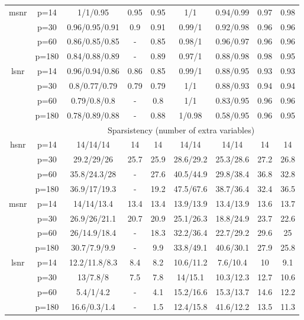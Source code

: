 \begin{table}[ht]
{\begin{tabular}{|c|c|ccccccc|}
  \midrule\multirow{4}[2]{*}{msnr} & p=14 & 1/1/0.95 & 0.95 & 0.95 & 1/1 & 0.94/0.99 & 0.97 & 0.98 \\ 
   & p=30 & 0.96/0.95/0.91 & 0.9 & 0.91 & 0.99/1 & 0.92/0.98 & 0.96 & 0.96 \\ 
   & p=60 & 0.86/0.85/0.85 & - & 0.85 & 0.98/1 & 0.96/0.97 & 0.96 & 0.96 \\ 
   & p=180 & 0.84/0.88/0.89 & - & 0.89 & 0.97/1 & 0.88/0.98 & 0.98 & 0.95 \\ 
  \midrule\multirow{4}[2]{*}{lsnr} & p=14 & 0.96/0.94/0.86 & 0.86 & 0.85 & 0.99/1 & 0.88/0.95 & 0.93 & 0.93 \\ 
   & p=30 & 0.8/0.77/0.79 & 0.79 & 0.79 & 1/1 & 0.88/0.93 & 0.94 & 0.94 \\ 
   & p=60 & 0.79/0.8/0.8 & - & 0.8 & 1/1 & 0.83/0.95 & 0.96 & 0.96 \\ 
   & p=180 & 0.78/0.89/0.88 & - & 0.88 & 1/0.98 & 0.58/0.95 & 0.96 & 0.95 \\ 
   \midrule 
 \multicolumn{1}{|c}{} &       & \multicolumn{7}{c|}{Sparsistency (number of extra variables)} \\
\midrule\multirow{4}[2]{*}{hsnr} & p=14 & 14/14/14 & 14 & 14 & 14/14 & 14/14 & 14 & 14 \\ 
   & p=30 & 29.2/29/26 & 25.7 & 25.9 & 28.6/29.2 & 25.3/28.6 & 27.2 & 26.8 \\ 
   & p=60 & 35.8/24.3/28 & - & 27.6 & 40.5/44.9 & 29.8/38.4 & 36.8 & 32.8 \\ 
   & p=180 & 36.9/17/19.3 & - & 19.2 & 47.5/67.6 & 38.7/36.4 & 32.4 & 36.5 \\ 
  \midrule\multirow{4}[2]{*}{msnr} & p=14 & 14/14/13.4 & 13.4 & 13.4 & 13.9/13.9 & 13.4/13.9 & 13.6 & 13.7 \\ 
   & p=30 & 26.9/26/21.1 & 20.7 & 20.9 & 25.1/26.3 & 18.8/24.9 & 23.7 & 22.6 \\ 
   & p=60 & 26/14.9/18.4 & - & 18.3 & 32.2/36.4 & 22.7/29.2 & 29.6 & 25 \\ 
   & p=180 & 30.7/7.9/9.9 & - & 9.9 & 33.8/49.1 & 40.6/30.1 & 27.9 & 25.8 \\ 
  \midrule\multirow{4}[2]{*}{lsnr} & p=14 & 12.2/11.8/8.3 & 8.4 & 8.2 & 10.6/11.2 & 7.6/10.4 & 10 & 9.1 \\ 
   & p=30 & 13/7.8/8 & 7.5 & 7.8 & 14/15.1 & 10.3/12.3 & 12.7 & 10.6 \\ 
   & p=60 & 5.4/1/4.2 & - & 4.1 & 15.2/16.6 & 15.3/13.7 & 14.6 & 12.2 \\ 
   & p=180 & 16.6/0.3/1.4 & - & 1.5 & 12.4/15.8 & 41.6/12.2 & 13.5 & 11.3 \\ 
   \bottomrule 
\end{tabular}
}
\end{table}
